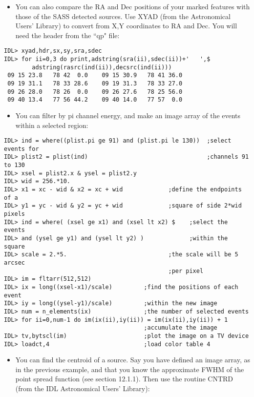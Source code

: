 \begin{itemize}
\item  You can also compare the RA and Dec positions of your marked features with
those of the SASS detected sources. Use XYAD (from the Astronomical Users'
Library) to convert from X,Y coordinates to RA and Dec. You will need the
header from the ``qp" file:
\end{itemize}

\medskip\noindent
\begin{verbatim}
IDL> xyad,hdr,sx,sy,sra,sdec
IDL> for ii=0,3 do print,adstring(sra(ii),sdec(ii))+'   ',$
        adstring(rasrc(ind(ii)),decsrc(ind(ii)))
 09 15 23.8   78 42  0.0    09 15 30.9   78 41 36.0
 09 19 31.1   78 33 28.6    09 19 31.3   78 33 27.0
 09 26 28.0   78 26  0.0    09 26 27.6   78 25 56.0
 09 40 13.4   77 56 44.2    09 40 14.0   77 57  0.0
\end{verbatim}

\begin{itemize}
\item  You can filter by pi channel energy, and make an image array of the events
within a selected region:
\end{itemize}

\medskip\noindent
\begin{verbatim}
IDL> ind = where((plist.pi ge 91) and (plist.pi le 130))  ;select events for
IDL> plist2 = plist(ind)                                  ;channels 91 to 130
IDL> xsel = plist2.x & ysel = plist2.y
IDL> wid = 256.*10.
IDL> x1 = xc - wid & x2 = xc + wid             ;define the endpoints of a
IDL> y1 = yc - wid & y2 = yc + wid             ;square of side 2*wid pixels
IDL> ind = where( (xsel ge x1) and (xsel lt x2) $    ;select the events
IDL> and (ysel ge y1) and (ysel lt y2) )             ;within the square
IDL> scale = 2.*5.                             ;the scale will be 5 arcsec
                                               ;per pixel
IDL> im = fltarr(512,512)
IDL> ix = long((xsel-x1)/scale)         ;find the positions of each event
IDL> iy = long((ysel-y1)/scale)         ;within the new image
IDL> num = n_elements(ix)               ;the number of selected events
IDL> for ii=0,num-1 do im(ix(ii),iy(ii)) = im(ix(ii),iy(ii)) + 1
                                        ;accumulate the image
IDL> tv,bytscl(im)                      ;plot the image on a TV device
IDL> loadct,4                           ;load color table 4
\end{verbatim}

\begin{itemize}
\item  You can find the centroid of a source. Say you have defined an image array,
as in the previous example, and that you know the approximate FWHM of the
point spread function (see section 12.1.1). Then use the routine CNTRD (from
the IDL Astronomical Users' Library):
\end{itemize}

